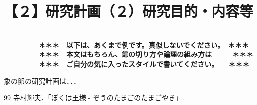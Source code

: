 
\section{【２】研究計画（２）研究目的・内容等}

\JSPSInstructions		%
\textbf{\\　　　　　＊＊＊　以下は、あくまで例です。真似しないでください。　＊＊＊\\
　　　　　＊＊＊　本文はもちろん、節の切り方や論理の組み方は　　　＊＊＊\\
　　　　　＊＊＊　ご自分の気に入ったスタイルで書いてください。　　＊＊＊}

	象の卵の研究計画は．．．

	\vspace{1cm}
	\begin{thebibliography}{99}
		 寺村輝夫、「ぼくは王様 - ぞうのたまごのたまごやき」.
	\end{thebibliography}


